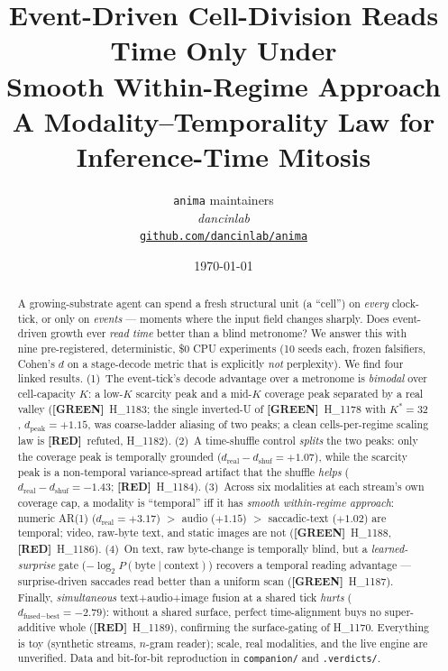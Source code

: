 \documentclass[11pt,a4paper]{article}
\title{
  \textbf{Event-Driven Cell-Division Reads Time Only Under\\
  Smooth Within-Regime Approach}\\[4pt]
  \large A Modality--Temporality Law for Inference-Time Mitosis
}
\author{
  \texttt{anima} maintainers\\
  \normalsize\textit{dancinlab}\\[2pt]
  \normalsize\href{https://github.com/dancinlab/anima}{\texttt{github.com/dancinlab/anima}}
}
\date{\today}
\providecommand{\tierGreen}{\textbf{[GREEN]}}
\providecommand{\tierRed}{\textbf{[RED]}}
\newcommand{\dreal}{d_{\mathrm{real}}}
\newcommand{\dshuf}{d_{\mathrm{shuf}}}
\newcommand{\Kstar}{K^{\!*}}
\begin{document}
\maketitle

\begin{abstract}
A growing-substrate agent can spend a fresh structural unit (a ``cell'') on
\emph{every} clock-tick, or only on \emph{events} --- moments where the input
field changes sharply. Does event-driven growth ever \emph{read time} better
than a blind metronome? We answer this with nine pre-registered, deterministic,
\$0 CPU experiments (10 seeds each, frozen falsifiers, Cohen's $d$ on a
stage-decode metric that is explicitly \emph{not} perplexity). We find four
linked results. (1)~The event-tick's decode advantage over a metronome is
\emph{bimodal} over cell-capacity $K$: a low-$K$ scarcity peak and a mid-$K$
coverage peak separated by a real valley (\tierGreen\ H\_1183; the single
inverted-U of \tierGreen\ H\_1178 with $\Kstar{=}32$, $d_{\mathrm{peak}}{=}{+}1.15$,
was coarse-ladder aliasing of two peaks; a clean cells-per-regime scaling law is
\tierRed\ refuted, H\_1182). (2)~A time-shuffle control \emph{splits} the two
peaks: only the coverage peak is temporally grounded
($\dreal{-}\dshuf{=}{+}1.07$), while the scarcity peak is a non-temporal
variance-spread artifact that the shuffle \emph{helps} ($\dreal{-}\dshuf{=}{-}1.43$;
\tierRed\ H\_1184). (3)~Across six modalities at each stream's own coverage cap,
a modality is ``temporal'' iff it has \emph{smooth within-regime approach}:
numeric AR(1) ($\dreal{=}{+}3.17$) $>$ audio ($+1.15$) $>$ saccadic-text ($+1.02$)
are temporal; video, raw-byte text, and static images are not (\tierGreen\ H\_1188,
\tierRed\ H\_1186). (4)~On text, raw byte-change is temporally blind, but a
\emph{learned-surprise} gate ($-\log_2 P(\text{byte}\mid\text{context})$) recovers
a temporal reading advantage --- surprise-driven saccades read better than a
uniform scan (\tierGreen\ H\_1187). Finally, \emph{simultaneous} text+audio+image
fusion at a shared tick \emph{hurts} ($d_{\text{fused}-\text{best}}{=}{-}2.79$):
without a shared surface, perfect time-alignment buys no super-additive whole
(\tierRed\ H\_1189), confirming the surface-gating of H\_1170. Everything is toy
(synthetic streams, $n$-gram reader); scale, real modalities, and the live engine
are unverified. Data and bit-for-bit reproduction in \texttt{companion/} and
\texttt{.verdicts/}.
\end{abstract}
\end{document}
